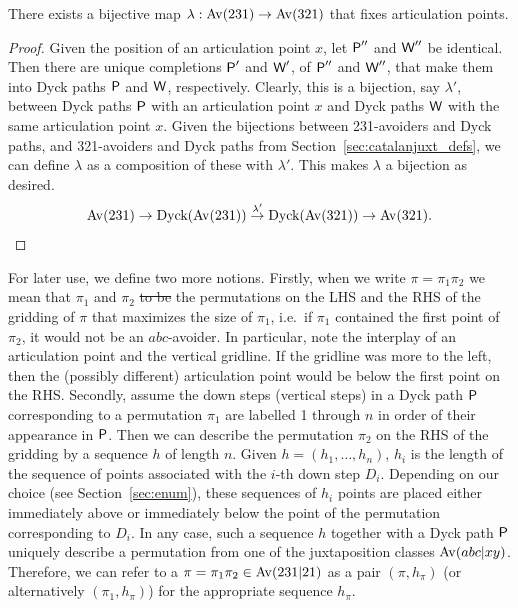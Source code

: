 \documentclass[12pt, a4paper, twoside]{report}
\providecommand{\DIFaddtex}[1]{{\protect\color{blue}\uwave{#1}}} %
\providecommand{\DIFdeltex}[1]{{\protect\color{red}\sout{#1}}}                      %
\providecommand{\DIFaddbegin}{} %
\providecommand{\DIFaddend}{} %
\providecommand{\DIFdelbegin}{} %
\providecommand{\DIFdelend}{} %
\providecommand{\DIFadd}[1]{\texorpdfstring{\DIFaddtex{#1}}{#1}} %
\providecommand{\DIFdel}[1]{\texorpdfstring{\DIFdeltex{#1}}{}} %
\begin{document}
\begin{lemma}
\label{lem:simplebijection}
There exists a bijective map $\lambda: \mathrm{Av}(231) \to \mathrm{Av}(321)$ that fixes articulation points.
\end{lemma}
\begin{proof}
Given the position of an articulation point $x$, let $\textsf{P}''$ and $\textsf{W}''$ be identical. Then there are unique completions $\textsf{P}'$ and $\textsf{W}'$, of $\textsf{P}''$ and $\textsf{W}''$, that make them into Dyck paths $\textsf{P}$ and $\textsf{W}$, respectively. Clearly, this is a bijection, say $\lambda'$, between Dyck paths $\textsf{P}$ with an articulation point $x$ and Dyck paths $\textsf{W}$ with the same articulation point $x$. Given the bijections between 231-avoiders and Dyck paths, and 321-avoiders and Dyck paths from Section~\ref{sec:catalanjuxt_defs}, we can define $\lambda$ as a composition of these with $\lambda'$. This makes $\lambda$ a bijection as desired.
\begin{align*}
\mathrm{Av}(231) \to \text{Dyck}(\mathrm{Av}(231)) \overset{\lambda'}{\to} \text{Dyck}(\mathrm{Av}(321))\to \mathrm{Av}(321).
\end{align*}
\end{proof}

For later use, we define two more notions. Firstly, when we write $\pi = \pi_1\pi_2$ we mean that $\pi_1$ and $\pi_2$ \DIFdelbegin \DIFdel{to be }\DIFdelend \DIFaddbegin \DIFadd{are }\DIFaddend the permutations on the LHS and the RHS of the gridding of $\pi$ that maximizes the size of $\pi_1$, i.e.~if $\pi_1$ contained the first point of $\pi_2$, it would not be an $abc$-avoider. In particular, note the interplay of an articulation point and the vertical gridline. If the gridline was more to the left, then the (possibly different) articulation point would be below the first point on the RHS. Secondly, assume the down steps (vertical steps) in a Dyck path $\textsf{P}$ corresponding to a permutation $\pi_1$ are labelled 1 through $n$ in order of their appearance in $\textsf{P}$. Then we can describe the permutation $\pi_2$ on the RHS of the gridding by a sequence $h$ of length $n$. Given $h = (h_1,\ldots,h_n)$, $h_i$ is the length of the sequence of points associated with the $i$-th down step $D_i$. Depending on our choice (see Section~\ref{sec:enum}), these sequences of $h_i$ points are placed either immediately above or immediately below the point of the permutation corresponding to $D_i$. In any case, such a sequence $h$ together with a Dyck path $\textsf{P}$ uniquely describe a permutation from one of the juxtaposition classes $\mathrm{Av}(abc|xy)$. Therefore, we can refer to a $\pi = \pi_1\pi_2 \in \mathrm{Av}(231|21)$ as a pair $(\pi,h_\pi)$ (or alternatively $(\pi_1,h_\pi)$) for the appropriate sequence $h_\pi$.
\end{document}
